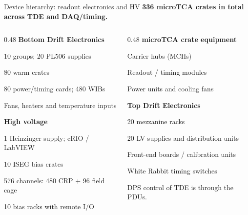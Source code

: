 \begin{frame}{Device hierarchy: readout electronics and HV}
\textbf{336 microTCA crates in total across TDE and DAQ/timing.}\par\bigskip
\small
\begin{columns}[T,onlytextwidth]
\begin{column}{0.48\textwidth}
\textbf{Bottom Drift Electronics}\par
\hspace*{0.8em}10 groups; 20 PL506 supplies\par
\hspace*{0.8em}80 warm crates\par
\hspace*{1.6em}80 power/timing cards; 480 WIBs\par
\hspace*{1.6em}Fans, heaters and temperature inputs\par\bigskip
\textbf{High voltage}\par
\hspace*{0.8em}1 Heinzinger supply; cRIO / LabVIEW\par
\hspace*{0.8em}10 ISEG bias crates\par
\hspace*{1.6em}576 channels: 480 CRP + 96 field cage\par
\hspace*{0.8em}10 bias racks with remote I/O
\end{column}
\begin{column}{0.48\textwidth}
\textbf{microTCA crate equipment}\par
\hspace*{0.8em}Carrier hubs (MCHs)\par
\hspace*{0.8em}Readout / timing modules\par
\hspace*{0.8em}Power units and cooling fans\par\bigskip
\textbf{Top Drift Electronics}\par
\hspace*{0.8em}20 mezzanine racks\par
\hspace*{0.8em}20 LV supplies and distribution units\par
\hspace*{0.8em}Front-end boards / calibration units\par
\hspace*{0.8em}White Rabbit timing switches\par\medskip
DPS control of TDE is through the PDUs.
\end{column}
\end{columns}
\end{frame}

